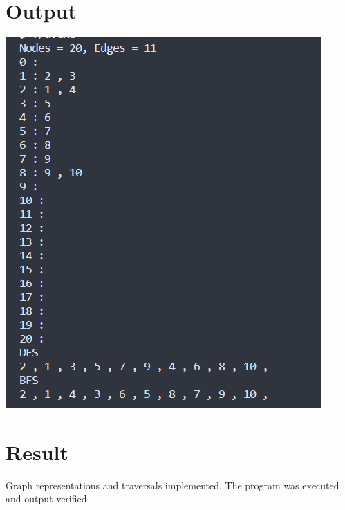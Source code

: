 \section{Output}
\includegraphics[]{Cycle_2/Outputs/GraphAdjList.png}

\section{Result}
Graph representations and traversals implemented. The program was executed and output
verified.
